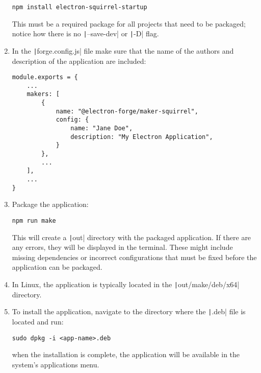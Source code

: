 \begin{enumerate}
\begin{verbatim}
npm install electron-squirrel-startup
    \end{verbatim}
    This must be a required package for all projects that need to be packaged; notice how there
    is no \texttt|--save-dev| or \texttt|-D| flag.
    \item In the \texttt|forge.config.js| file make sure that the name of the authors
    and description of the application are included:
    \begin{verbatim}
module.exports = {
    ...
    makers: [
        {
            name: "@electron-forge/maker-squirrel",
            config: {
                name: "Jane Doe",
                description: "My Electron Application",
            }
        },
        ...
    ],
    ...
}
    \end{verbatim}
    \item Package the application:
    \begin{verbatim}
npm run make
    \end{verbatim}
    This will create a \texttt|out| directory with the packaged application. If there are
    any errors, they will be displayed in the terminal. These might include missing dependencies or
    incorrect configurations that must be fixed before the application can be packaged.
    \item In Linux, the application is typically located in the
    \texttt|out/make/deb/x64| directory.
    \item To install the application, navigate to the directory where the \texttt|.deb|
    file is located and run:
    \begin{verbatim}
sudo dpkg -i <app-name>.deb
    \end{verbatim}
    when the installation is complete, the application will be available in the system's
    applications menu.
\end{enumerate}
